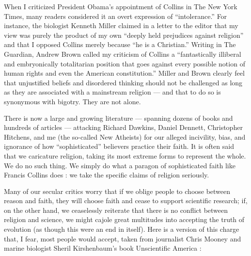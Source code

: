 \documentclass[a4paper,14pt]{extarticle}
\begin{document}
When I criticized President Obama’s appointment of Collins in The New York Times, many readers considered it an overt expression of ``intolerance.''
For instance, the biologist Kenneth Miller claimed in a letter to the editor that my view was purely the product of my own ``deeply held prejudices against religion'' and that I opposed Collins merely because ``he is a Christian.''
Writing in The Guardian, Andrew Brown called my criticism of Collins a ``fantastically illiberal and embryonically totalitarian position that goes against every possible notion of human rights and even the American constitution.''
Miller and Brown clearly feel that unjustified beliefs and disordered thinking should not be challenged as long as they are associated with a mainstream religion --- and that to do so is synonymous with bigotry.
They are not alone.

There is now a large and growing literature --- spanning dozens of books and hundreds of articles --- attacking Richard Dawkins, Daniel Dennett, Christopher Hitchens, and me (the so-called New Atheists) for our alleged incivility, bias, and ignorance of how ``sophisticated'' believers practice their faith.
It is often said that we caricature religion, taking its most extreme forms to represent the whole.
We do no such thing.
We simply do what a paragon of sophisticated faith like Francis Collins does :
we take the specific claims of religion seriously.

Many of our secular critics worry that if we oblige people to choose between reason and faith, they will choose faith and cease to support scientific research;
if, on the other hand, we ceaselessly reiterate that there is no conflict between religion and science, we might cajole great multitudes into accepting the truth of evolution (as though this were an end in itself).
Here is a version of this charge that, I fear, most people would accept, taken from journalist Chris Mooney and marine biologist Sheril Kirshenbaum’s book Unscientific America :
\end{document}
